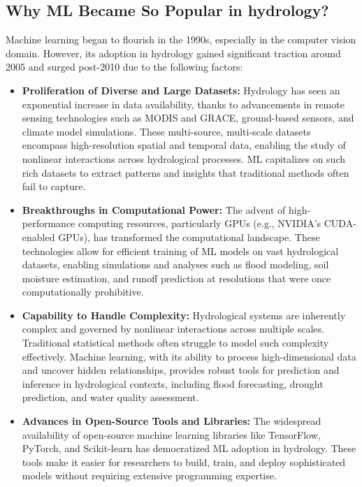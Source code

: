 \subsection{Why ML Became So Popular in hydrology?}
Machine learning began to flourish in the 1990s, especially in the computer vision domain. However, its adoption in hydrology gained significant traction around 2005 and surged post-2010 due to the following factors:
\begin{itemize}
    \item \textbf{Proliferation of Diverse and Large Datasets:} Hydrology has seen an exponential increase in data availability, thanks to advancements in remote sensing technologies such as MODIS and GRACE, ground-based sensors, and climate model simulations. These multi-source, multi-scale datasets encompass high-resolution spatial and temporal data, enabling the study of nonlinear interactions across hydrological processes. ML capitalizes on such rich datasets to extract patterns and insights that traditional methods often fail to capture.
    \item \textbf{Breakthroughs in Computational Power:} The advent of high-performance computing resources, particularly GPUs (e.g., NVIDIA’s CUDA-enabled GPUs), has transformed the computational landscape. These technologies allow for efficient training of ML models on vast hydrological datasets, enabling simulations and analyses such as flood modeling, soil moisture estimation, and runoff prediction at resolutions that were once computationally prohibitive.

    \item \textbf{Capability to Handle Complexity:} Hydrological systems are inherently complex and governed by nonlinear interactions across multiple scales. Traditional statistical methods often struggle to model such complexity effectively. Machine learning, with its ability to process high-dimensional data and uncover hidden relationships, provides robust tools for prediction and inference in hydrological contexts, including flood forecasting, drought prediction, and water quality assessment.
    
    \item \textbf{Advances in Open-Source Tools and Libraries:} The widespread availability of open-source machine learning libraries like TensorFlow, PyTorch, and Scikit-learn has democratized ML adoption in hydrology. These tools make it easier for researchers to build, train, and deploy sophisticated models without requiring extensive programming expertise.

    
\end{itemize}

